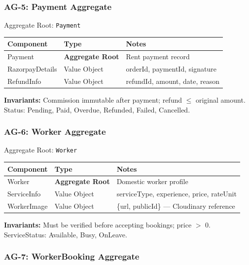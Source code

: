 \documentclass[12pt,a4paper]{article}
\begin{document}
\subsubsection{AG-5: Payment Aggregate}

\begin{infobox}{Aggregate Root: \texttt{Payment}}
\begin{tabular}{@{}p{3cm}p{2.8cm}p{7.8cm}@{}}
\textbf{Component} & \textbf{Type} & \textbf{Notes} \\
\hline
Payment & \textbf{Aggregate Root} & Rent payment record \\
RazorpayDetails & Value Object & orderId, paymentId, signature \\
RefundInfo & Value Object & refundId, amount, date, reason \\
\end{tabular}

\textbf{Invariants:} Commission immutable after payment; refund $\leq$ original amount. Status: Pending, Paid, Overdue, Refunded, Failed, Cancelled.
\end{infobox}

\subsubsection{AG-6: Worker Aggregate}

\begin{infobox}{Aggregate Root: \texttt{Worker}}
\begin{tabular}{@{}p{3cm}p{2.8cm}p{7.8cm}@{}}
\textbf{Component} & \textbf{Type} & \textbf{Notes} \\
\hline
Worker & \textbf{Aggregate Root} & Domestic worker profile \\
ServiceInfo & Value Object & serviceType, experience, price, rateUnit \\
WorkerImage & Value Object & \{url, publicId\} — Cloudinary reference \\
\end{tabular}

\textbf{Invariants:} Must be verified before accepting bookings; price $>$ 0. ServiceStatus: Available, Busy, OnLeave.
\end{infobox}

\subsubsection{AG-7: WorkerBooking Aggregate}
\end{document}
